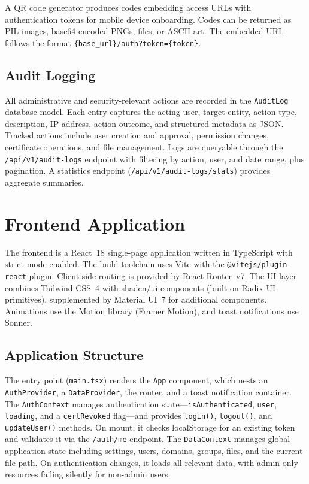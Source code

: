 \documentclass[12pt,letterpaper]{report}
\begin{document}
A QR code generator produces codes embedding access URLs with authentication tokens for mobile device onboarding. Codes can be returned as PIL images, base64-encoded PNGs, files, or ASCII art. The embedded URL follows the format \texttt{\{base\_url\}/auth?token=\{token\}}.

\subsection{Audit Logging}

All administrative and security-relevant actions are recorded in the \texttt{AuditLog} database model. Each entry captures the acting user, target entity, action type, description, IP address, action outcome, and structured metadata as JSON. Tracked actions include user creation and approval, permission changes, certificate operations, and file management. Logs are queryable through the \texttt{/api/v1/audit-logs} endpoint with filtering by action, user, and date range, plus pagination. A statistics endpoint (\texttt{/api/v1/audit-logs/stats}) provides aggregate summaries.

\section{Frontend Application}

The frontend is a React~18 single-page application written in TypeScript with strict mode enabled. The build toolchain uses Vite with the \texttt{@vitejs/plugin-react} plugin. Client-side routing is provided by React Router~v7. The UI layer combines Tailwind CSS~4 with shadcn/ui components (built on Radix UI primitives), supplemented by Material UI~7 for additional components. Animations use the Motion library (Framer Motion), and toast notifications use Sonner.

\subsection{Application Structure}

The entry point (\texttt{main.tsx}) renders the \texttt{App} component, which nests an \texttt{AuthProvider}, a \texttt{DataProvider}, the router, and a toast notification container. The \texttt{AuthContext} manages authentication state---\texttt{isAuthenticated}, \texttt{user}, \texttt{loading}, and a \texttt{certRevoked} flag---and provides \texttt{login()}, \texttt{logout()}, and \texttt{updateUser()} methods. On mount, it checks localStorage for an existing token and validates it via the \texttt{/auth/me} endpoint. The \texttt{DataContext} manages global application state including settings, users, domains, groups, files, and the current file path. On authentication changes, it loads all relevant data, with admin-only resources failing silently for non-admin users.
\end{document}
